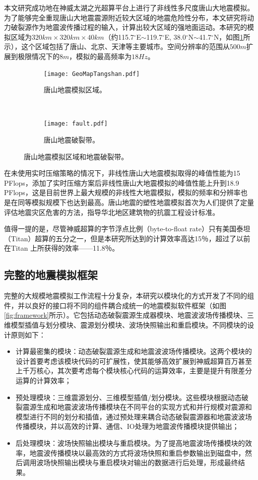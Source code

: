本文研究成功地在神威太湖之光超算平台上进行了非线性多尺度唐山大地震模拟。为了能够完全重现唐山大地震震源附近较大区域的地震危险性分布，本文研究将动力破裂源作为地震波传播过程的输入，计算出较大区域的强地面运动。本研究的模拟区域为$320km \times 320km \times 40km$（约115.7$^\circ$E$\sim$119.7$^\circ$E, 38.0$^\circ$N$\sim$41.7$^\circ$N，如图\ref{fig:tangshan_region}所示），这个区域包括了唐山、北京、天津等主要城市。空间分辨率的范围从$500m$扩展到极限情况下的$8m$，模拟的最高频率为$18Hz$。

\begin{figure}[ht]
    \centering
    \begin{subfigure}[b]{0.5\textwidth}
        \centering
        \texttt{[image: GeoMapTangshan.pdf]}
        \caption{唐山地震模拟区域。}
    \end{subfigure}%
    ~
    \begin{subfigure}[b]{0.5\textwidth}
        \centering
        \texttt{[image: fault.pdf]}
        \caption{唐山地震破裂带。}
    \end{subfigure}
    \caption{唐山地震模拟区域和地震破裂带。}
    \label{fig:tangshan_region}
\end{figure}


在未使用实时压缩策略的情况下，非线性唐山大地震模拟取得的峰值性能为15 PFlops，添加了实时压缩方案后非线性唐山大地震模拟的峰值性能上升到18.9 PFlops，这是目前世界上最大规模的非线性大地震模拟，模拟的频率和分辨率也是在同等模拟规模下也达到最高。唐山地震的塑性地震模拟首次为人们提供了定量评估地震灾区危害的方法，指导华北地区建筑物的抗震工程设计标准。

值得一提的是，尽管神威超算的字节浮点比例（byte-to-float rate）只有美国泰坦（Titan）超算的五分之一，但是本研究所达到的计算效率高达15％，超过了以前在Titan \citep{roten2016high}上所获得的效率——11.8％。

\subsection{完整的地震模拟框架}
完整的大规模地震模拟工作流程十分复杂，本研究以模块化的方式开发了不同的组件，并以良好的接口将不同的组件耦合成统一的地震模拟软件框架（如图\ref{fig:framework}所示）。它包括动态破裂震源生成器模块、地震波波场传播模块、三维模型插值与划分模块、震源划分模块、波场快照输出和重启模块。不同模块的设计原则如下：
\begin{itemize}
  \item 计算最密集的模块：动态破裂震源生成和地震波波场传播模块。这两个模块的设计首要考虑该模块代码的可扩展性，使其能够高效扩展到神威超算百万甚至上千万核心，其次要考虑每个模块核心代码的运算效率，主要是提升有限差分运算的计算效率；
  \item 预处理模块：三维震源划分、三维模型插值/划分模块。这些模块根据动态破裂震源生成和地震波波场传播模块在不同平台的实现方式和并行规模对震源和模型进行不同的划分和插值，通过预处理来耦合动态破裂震源器和地震波波场传播模块，并以高效的计算、通信、IO处理为地震波传播模块提供输出；
  \item 后处理模块：波场快照输出模块与重启模块。为了提高地震波场传播模块的效率，地震波传播模块以最高效的方式将波场快照和重启参数输出到磁盘中，然后调用波场快照输出模块与重启模块对输出的数据进行后处理，形成最终结果。
\end{itemize}

